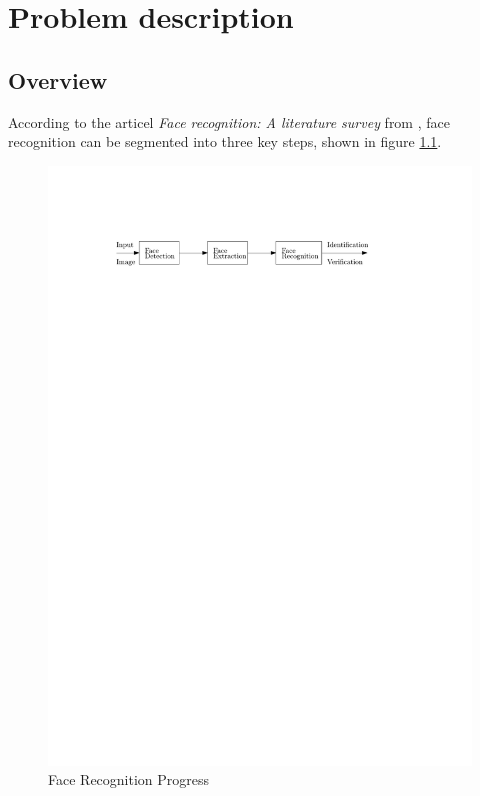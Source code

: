 \documentclass[Bachelorarbeit.tex]{subfiles}
\begin{document}
\chapter{Problem description}\label{ProblemDescription}
\section{Overview}
According to the articel  \textit{Face recognition: A literature survey} from \cite{FRLiteratureSurvey}, face recognition can be segmented into three key steps, shown in figure \ref{FRP}.\\

\begin{figure}[hbtp]
\centering
\includegraphics[page=1,scale=1]{./pictures/drawings}
\caption{Face Recognition Progress \label{FRP}}
\end{figure}
\end{document}
